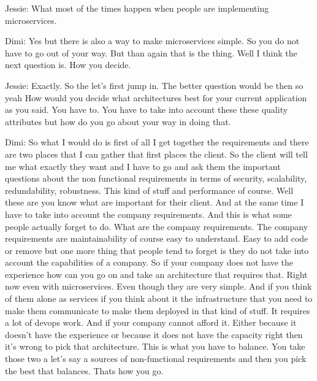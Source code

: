 Jessie: What most of the times happen when people are implementing microservices.

Dimi: Yes but there is also a way to make microservices simple. So you do not have to go out of your way. But than again that is the thing. Well I think the next question is. How you decide.

Jessie: Exactly. So the let's first jump in. The better question would be then so yeah How would you decide what architectures best for your current application as you said. You have to. You have to take into account these these quality attributes but how do you go about your way in doing that.

Dimi: So what I would do is first of all I get together the requirements and there are two places that I can gather that first places the client. So the client will tell me what exactly they want and I have to go and ask them the important questions about the non functional requirements in terms of security, scalability, redundability, robustness. This kind of stuff and performance of course. Well these are you know what are important for their client. And at the same time I have to take into account the company requirements. And this is what some people actually forget to do. What are the company requirements. The company requirements are maintainability of course easy to understand. Easy to add code or remove but one more thing that people tend to forget is they do not take into account the capabilities of a company. So if your company does not have the experience how can you go on and take an architecture that requires that. Right now even with microservices. Even though they are very simple. And if you think of them alone as services if you think about it the infrastructure that you need to make them communicate to make them deployed in that kind of stuff. It requires a lot of devops work. And if your company cannot afford it. Either because it doesn't have the experience or because it does not have the capacity right then it's wrong to pick that architecture. This is what you have to balance. You take those two a let's say a sources of non-functional requirements and then you pick the best that balances. Thats how you go.

